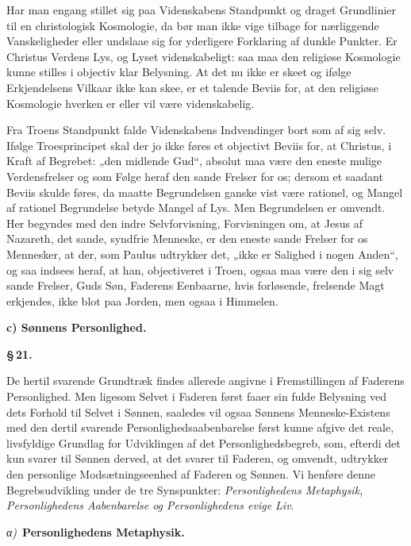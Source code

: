 \documentclass[12pt]{book}
\newcommand{\parmark}[1]{\begin{center}{\bfseries \S\,#1.}\end{center}}
\newcommand{\runhead}[1]{%
  \medskip\begin{center}{\bfseries #1}\end{center}\medskip}
\newcommand{\greekrun}[2]{%
  \medskip\begin{center}{\itshape #1)}\ {\bfseries #2}\end{center}\medskip}
\begin{document}
Har man engang stillet sig paa Videnskabens Standpunkt og draget
Grundlinier til en christologisk Kosmologie, da bør man ikke vige
tilbage for nærliggende Vanskeligheder eller undslaae sig for
yderligere Forklaring af dunkle Punkter. Er Christus Verdens Lys, og
Lyset videnskabeligt: saa maa den religiøse Kosmologie kunne stilles
i objectiv klar Belysning. At det nu ikke er skeet og ifølge
Erkjendelsens Vilkaar ikke kan skee, er et talende Beviis for, at
den religiøse Kosmologie hverken er eller vil være videnskabelig.

Fra Troens Standpunkt falde Videnskabens Indvendinger bort som af
sig selv. Ifølge Troesprincipet skal
der jo ikke føres et objectivt Beviis for, at Christus, i Kraft af
Begrebet: „den midlende Gud“, absolut maa være den eneste mulige
Verdensfrelser og som Følge heraf den sande Frelser for os; dersom
et saadant Beviis skulde føres, da maatte Begrundelsen ganske vist
være rationel, og Mangel af rationel Begrundelse betyde Mangel af
Lys. Men Begrundelsen er omvendt. Her begyndes med den indre
Selvforvisning, Forvisningen om, at Jesus af Nazareth, det sande,
syndfrie Menneske, er den eneste sande Frelser for os Mennesker, at
der, som Paulus udtrykker det, „ikke er Salighed i nogen Anden“, og
saa indsees heraf, at han, objectiveret i Troen, ogsaa maa være den
i sig selv sande Frelser, Guds Søn, Faderens Eenbaarne, hvis
forløsende, frelsende Magt erkjendes, ikke blot paa Jorden, men
ogsaa i Himmelen.

\runhead{c) Sønnens Personlighed.}
\parmark{21}

De hertil svarende Grundtræk findes allerede angivne i
Fremstillingen af Faderens Personlighed. Men ligesom Selvet i
Faderen først faaer sin fulde Belysning ved dets Forhold til Selvet
i Sønnen, saaledes vil ogsaa Sønnens Menneske-Existens med den
dertil svarende Personlighedsaabenbarelse først kunne afgive det
reale, livsfyldige Grundlag for Udviklingen af det
Personlighedsbegreb, som, efterdi det kun svarer til Sønnen derved,
at det svarer til Faderen, og omvendt, udtrykker den personlige
Modsætningseenhed af Faderen og Sønnen. Vi henføre denne
Begrebsudvikling under de tre Synspunkter: \emph{Personlighedens
Metaphysik, Personlighedens Aabenbarelse og Personlighedens evige
Liv}.

\greekrun{α}{Personlighedens Metaphysik.}
\end{document}
